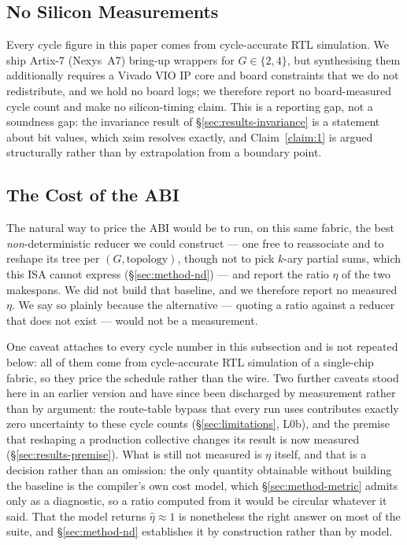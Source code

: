 \documentclass[journal,10pt]{IEEEtran}
\theoremstyle{plain}
\theoremstyle{definition}
\theoremstyle{remark}
\begin{document}
\subsection{No Silicon Measurements}\label{sec:results-fpga}

Every cycle figure in this paper comes from cycle-accurate RTL simulation.
We ship Artix-7 (Nexys~A7) bring-up wrappers for $G \in \{2,4\}$, but
synthesising them additionally requires a Vivado VIO IP core and board
constraints that we do not redistribute, and we hold no board logs; we
therefore report no board-measured cycle count and make no silicon-timing
claim. This is a reporting gap, not a soundness gap: the invariance result of
\S\ref{sec:results-invariance} is a statement about bit values, which xsim
resolves exactly, and Claim~\ref{claim:1} is argued structurally rather than
by extrapolation from a boundary point.

\subsection{The Cost of the ABI}\label{sec:results-overhead}

The natural way to price the ABI would be to run, on this same fabric, the
best \emph{non}-deterministic reducer we could construct --- one free to
reassociate and to reshape its tree per $(G,\text{topology})$, though not to
pick $k$-ary partial sums, which this ISA cannot express
(\S\ref{sec:method-nd}) --- and report the ratio $\eta$ of the two makespans.
We did not build that baseline, and we therefore report no measured $\eta$.
We say so plainly because the alternative --- quoting a ratio against a
reducer that does not exist --- would not be a measurement.

One caveat attaches to every cycle number in this subsection and is not
repeated below: all of them come from cycle-accurate RTL simulation of a
single-chip fabric, so they price the schedule rather than the wire. Two
further caveats stood here in an earlier version and have since been
discharged by measurement rather than by argument: the route-table bypass that
every run uses contributes exactly zero uncertainty to these cycle counts
(\S\ref{sec:limitations}, L0b), and the premise that reshaping a production
collective changes its result is now measured
(\S\ref{sec:results-premise}). What is still not
measured is $\eta$ itself, and that is a decision rather than an omission: the
only quantity obtainable without building the baseline is the compiler's own
cost model, which \S\ref{sec:method-metric} admits only as a diagnostic, so a
ratio computed from it would be circular whatever it said. That the model
returns $\hat\eta \approx 1$ is nonetheless the right answer on most of the
suite, and \S\ref{sec:method-nd} establishes it by construction rather than
by model.
\end{document}
